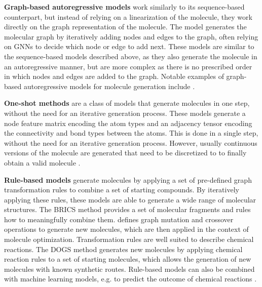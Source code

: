 \textbf{Graph-based autoregressive models} work similarly to its sequence-based counterpart, but
instead of relying on a linearization of the molecule, they work directly on the graph
representation of the molecule. The model generates the molecular graph by iteratively adding nodes
and edges to the graph, often relying on \acp{GNN} to decide which node or edge to add next. These
models are similar to the sequence-based models described above, as they also generate the molecule
in an autoregressive manner, but are more complex as there is no prescribed order in which nodes and
edges are added to the graph. Notable examples of graph-based autoregressive models for molecule
generation include
\citep{liuConstrainedGraphVariational2018,liLearningDeepGenerative2018,youGraphConvolutionalPolicy2019,cohen-karlikOvercomingOrderAutoregressive2024}.

\textbf{One-shot methods} are a class of models that generate molecules in one step, without the
need for an iterative generation process. These models generate a node feature matrix encoding the
atom types and an adjacency tensor encoding the connectivity and bond types between the atoms. This
is done in a single step, without the need for an iterative generation process. However, usually
continuous versions of the molecule are generated that need to be discretized to to finally obtain a
valid molecule \citep{decaoMolGANImplicitGenerative2018,madhawaGraphNVPInvertibleFlow2019}.

\textbf{Rule-based models} generate molecules by applying a set of pre-defined graph transformation
rules to combine a set of starting compounds. By iteratively applying these rules, these models are
able to generate a wide range of molecular structures. The BRICS \citep{degenArtCompilingUsing2008}
method provides a set of molecular fragments and rules how to meaningfully combine them.
\citet{jensenGraphbasedGeneticAlgorithm2019} defines graph mutation and crossover operations to
generate new molecules, which are then applied in the context of molecule optimization.
Transformation rules are well suited to describe chemical reactions. The DOGS method
\citep{hartenfellerDOGSReactionDrivenNovo2012} generates new molecules by applying chemical reaction
rules to a set of starting molecules, which allows the generation of new molecules with known
synthetic routes. Rule-based models can also be combined with machine learning models, e.g. to
predict the outcome of chemical reactions
\citep{seglerNeuralSymbolicMachineLearning2017,seglerPlanningChemicalSyntheses2018,fortunatoDataAugmentationPretraining2020}.


